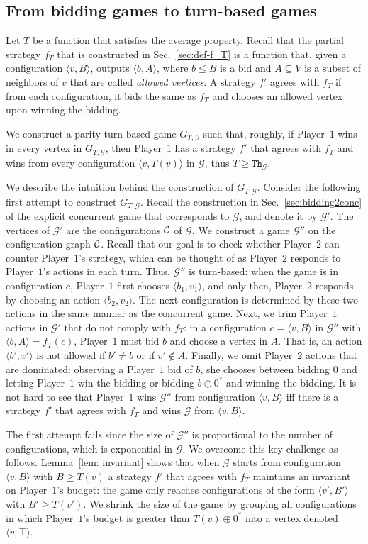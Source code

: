 \documentclass{article}\providecommand{\nequiv}{\not\equiv}\usepackage[a4paper,margin=20mm]{geometry}
\newcommand{\PO}{Player~$1$\xspace}
\newcommand{\PT}{Player~$2$\xspace}
\newcommand{\C}{{\cal C}}
\newcommand{\G}{{\mathcal G}}
\newcommand{\thresh}{\texttt{Th}\xspace}
\newcommand{\zug}[1]{\langle #1  \rangle}
\newcommand{\succb}[1]{#1 \oplus 0^*\xspace}
\begin{document}
\subsection{From bidding games to turn-based games}
Let  \(T\) be a function that satisfies the average property. Recall that the partial strategy \(f_T\) that is constructed in Sec.~\ref{sec:def-f_T} is a function that, given a configuration $\zug{v, B}$, outputs $\zug{b, A}$, where $b \leq B$ is a bid and $A \subseteq V$ is a subset of neighbors of $v$ that are called {\em allowed vertices}. A strategy $f'$ agrees with $f_T$ if from each configuration, it bids the same as $f_T$ and chooses an allowed vertex upon winning the bidding. 

We construct a parity turn-based game $G_{T, \G}$ such that, roughly, if \PO wins in every vertex in $G_{T, \G}$, then \PO has a strategy $f'$ that agrees with $f_T$ and wins from every configuration $\zug{v, T(v)}$ in $\G$, thus $T \geq \thresh_\G$. 

We describe the intuition behind the construction of $G_{T, \G}$. Consider the following first attempt to construct $G_{T, \G}$. 
Recall the construction in Sec.~\ref{sec:bidding2conc} of the explicit concurrent game that corresponds to $\G$, and denote it by $\G'$. The vertices of $\G'$ are the configurations $\C$ of $\G$. We construct a game $\G''$ on the configuration graph $\C$. 
Recall that our goal is to check whether \PT can counter \PO's strategy, which can be thought of as \PT responds to \PO's actions in each turn. Thus, $\G''$ is turn-based: when the game is in configuration $c$, \PO first chooses $\zug{b_1, v_1}$, and only then, \PT responds by choosing an action $\zug{b_2, v_2}$. The next configuration is determined by these two actions in the same manner as the concurrent game. 
Next, we trim \PO actions in $\G'$ that do not comply with $f_T$: in a configuration $c = \zug{v, B}$ in $\G''$ with $\zug{b, A} = f_T(c)$, \PO must bid $b$ and choose a vertex in $A$. That is, an action $\zug{b', v'}$ is not allowed if $b' \neq b$ or if $v' \notin A$. Finally, we omit \PT actions that are dominated: observing a \PO bid of $b$, she chooses between bidding $0$ and letting \PO win the bidding or bidding $\succb{b}$ and winning the bidding. 
It is not hard to see that \PO wins $\G''$ from configuration $\zug{v, B}$ iff there is a strategy $f'$ that agrees with $f_T$ and wins $\G$ from $\zug{v, B}$.

The first attempt fails since the size of $\G''$ is proportional to the number of configurations, which is exponential in $\G$. 
We overcome this key challenge as follows. 
Lemma~\ref{lem: invariant} shows that when $\G$ starts from configuration $\zug{v, B}$ with $B \geq T(v)$ a strategy $f'$ that agrees with $f_T$ maintains an invariant on \PO's budget: the game only reaches configurations of the form $\zug{v', B'}$ with $B' \geq T(v')$. 
We shrink the size of the game by grouping all configurations in which \PO's budget is greater than $\succb{T(v)}$ into a vertex denoted $\zug{v, \top}$. 
\end{document}
